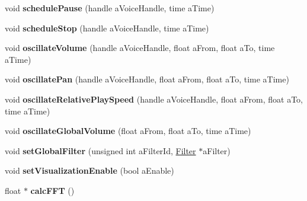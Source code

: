 \begin{DoxyCompactItemize}
\item 
\mbox{\label{class_so_loud_1_1_soloud_aafbb714419cbf0ac4cbc14c06aaf3fd7}} 
void {\bfseries schedule\+Pause} (handle a\+Voice\+Handle, time a\+Time)
\item 
\mbox{\label{class_so_loud_1_1_soloud_a00c9b4715e18143d3f13ae9c42d2ae45}} 
void {\bfseries schedule\+Stop} (handle a\+Voice\+Handle, time a\+Time)
\item 
\mbox{\label{class_so_loud_1_1_soloud_a260cb4446fc97249cfd9c353020bfafa}} 
void {\bfseries oscillate\+Volume} (handle a\+Voice\+Handle, float a\+From, float a\+To, time a\+Time)
\item 
\mbox{\label{class_so_loud_1_1_soloud_aa8843cec3f6cfff5a3e6652f890e470e}} 
void {\bfseries oscillate\+Pan} (handle a\+Voice\+Handle, float a\+From, float a\+To, time a\+Time)
\item 
\mbox{\label{class_so_loud_1_1_soloud_a9ad9542bc726a315b130b40916b095a0}} 
void {\bfseries oscillate\+Relative\+Play\+Speed} (handle a\+Voice\+Handle, float a\+From, float a\+To, time a\+Time)
\item 
\mbox{\label{class_so_loud_1_1_soloud_ae91d826c1d8ba64dbf395fe9c679a82e}} 
void {\bfseries oscillate\+Global\+Volume} (float a\+From, float a\+To, time a\+Time)
\item 
\mbox{\label{class_so_loud_1_1_soloud_a7a357dd58112d34becacfa100d6b7a19}} 
void {\bfseries set\+Global\+Filter} (unsigned int a\+Filter\+Id, \mbox{\hyperlink{class_so_loud_1_1_filter}{Filter}} $\ast$a\+Filter)
\item 
\mbox{\label{class_so_loud_1_1_soloud_a291ec9f5539cd530b6eec30ec83155b4}} 
void {\bfseries set\+Visualization\+Enable} (bool a\+Enable)
\item 
\mbox{\label{class_so_loud_1_1_soloud_a177bd43443be97f8b372ec03d2c76ec9}} 
float $\ast$ {\bfseries calc\+F\+FT} ()
\item 
\mbox{\label{class_so_loud_1_1_soloud_a20d80a4165eac224db098eef2e91c235}} 

\end{DoxyCompactItemize}
